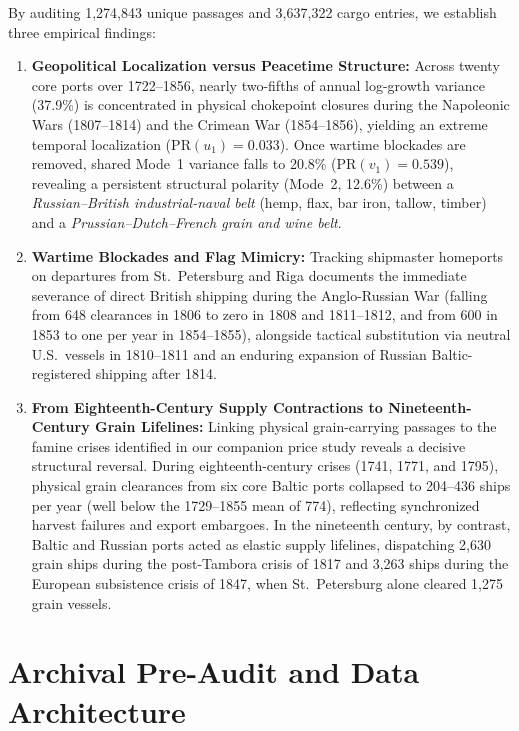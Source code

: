 \documentclass[11pt,a4paper]{article}
\begin{document}
By auditing 1,274,843 unique passages and 3,637,322 cargo entries, we establish three empirical findings:
\begin{enumerate}
    \item \textbf{Geopolitical Localization versus Peacetime Structure:} Across twenty core ports over 1722--1856, nearly two-fifths of annual log-growth variance (37.9\%) is concentrated in physical chokepoint closures during the Napoleonic Wars (1807--1814) and the Crimean War (1854--1856), yielding an extreme temporal localization ($\mathrm{PR}(u_1) = 0.033$). Once wartime blockades are removed, shared Mode~1 variance falls to 20.8\% ($\mathrm{PR}(v_1) = 0.539$), revealing a persistent structural polarity (Mode~2, 12.6\%) between a \emph{Russian--British industrial-naval belt} (hemp, flax, bar iron, tallow, timber) and a \emph{Prussian--Dutch--French grain and wine belt}.
    \item \textbf{Wartime Blockades and Flag Mimicry:} Tracking shipmaster homeports on departures from St.~Petersburg and Riga documents the immediate severance of direct British shipping during the Anglo-Russian War (falling from 648 clearances in 1806 to zero in 1808 and 1811--1812, and from 600 in 1853 to one per year in 1854--1855), alongside tactical substitution via neutral U.S.\ vessels in 1810--1811 and an enduring expansion of Russian Baltic-registered shipping after 1814.
    \item \textbf{From Eighteenth-Century Supply Contractions to Nineteenth-Century Grain Lifelines:} Linking physical grain-carrying passages to the famine crises identified in our companion price study reveals a decisive structural reversal. During eighteenth-century crises (1741, 1771, and 1795), physical grain clearances from six core Baltic ports collapsed to 204--436 ships per year (well below the 1729--1855 mean of 774), reflecting synchronized harvest failures and export embargoes. In the nineteenth century, by contrast, Baltic and Russian ports acted as elastic supply lifelines, dispatching 2,630 grain ships during the post-Tambora crisis of 1817 and 3,263 ships during the European subsistence crisis of 1847, when St.~Petersburg alone cleared 1,275 grain vessels.
\end{enumerate}

\section{Archival Pre-Audit and Data Architecture}
\end{document}
